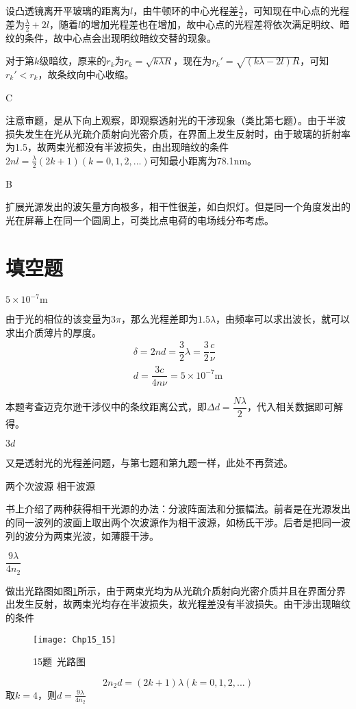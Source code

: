设凸透镜离开平玻璃的距离为$l$，由牛顿环的中心光程差$\frac{\lambda}{2}$，可知现在中心点的光程差为$\frac{\lambda}{2}+2l$，随着$l$的增加光程差也在增加，故中心点的光程差将依次满足明纹、暗纹的条件，故中心点会出现明纹暗纹交替的现象。

对于第$k$级暗纹，原来的$r_k$为$r_k=\sqrt{k\lambda R}$，现在为$r_k'=\sqrt{(k\lambda-2l)R}$，可知$r_k'<r_k$，故条纹向中心收缩。

\exercise C

\solve 注意审题，是从下向上观察，即观察透射光的干涉现象（类比第七题）。由于半波损失发生在光从光疏介质射向光密介质，在界面上发生反射时，由于玻璃的折射率为1.5，故两束光都没有半波损失，由出现暗纹的条件$2nl=\frac{\lambda}{2}(2k+1)(k=0,1,2,...)$可知最小距离为78.1nm。

\exercise B

\solve 扩展光源发出的波矢量方向极多，相干性很差，如白炽灯。但是同一个角度发出的光在屏幕上在同一个圆周上，可类比点电荷的电场线分布考虑。
\section{填空题}
\exercise $5\times10^{-7}\mathrm{m}$ 

\solve 由于光的相位的该变量为$3\pi$，那么光程差即为$1.5\lambda$，由频率可以求出波长，就可以求出介质薄片的厚度。
\begin{gather*}
	\delta=2nd=\dfrac{3}{2}\lambda=\dfrac{3}{2}\dfrac{c}{\nu}\\
	d=\dfrac{3c}{4n\nu}=5\times 10^{-7}\mathrm{m}
\end{gather*}


\solve 本题考查迈克尔逊干涉仪中的条纹距离公式，即$\Delta d=\dfrac{Nλ}{2}$，代入相关数据即可解得。

\exercise $3d$

\solve  又是透射光的光程差问题，与第七题和第九题一样，此处不再赘述。

\exercise 两个次波源 \quad 相干波源 

\solve 书上介绍了两种获得相干光源的办法：分波阵面法和分振幅法。前者是在光源发出的同一波列的波面上取出两个次波源作为相干波源，如杨氏干涉。后者是把同一波列的波分为两束光波，如薄膜干涉。

\exercise $\dfrac{9\lambda}{4n_2}$

\solve 做出光路图如图\ref{fig:15_15}所示，由于两束光均为从光疏介质射向光密介质并且在界面分界出发生反射，故两束光均存在半波损失，故光程差没有半波损失。由干涉出现暗纹的条件
\begin{figure}[!h]
	\centering
	\texttt{[image: Chp15\_15]}
	\caption{15题\ 光路图}\label{fig:15_15}
\end{figure}
\[
2n_2d=(2k+1)\lambda(k=0,1,2,...)
\]
取$k=4$，则$d=\frac{9\lambda}{4n_2}$


